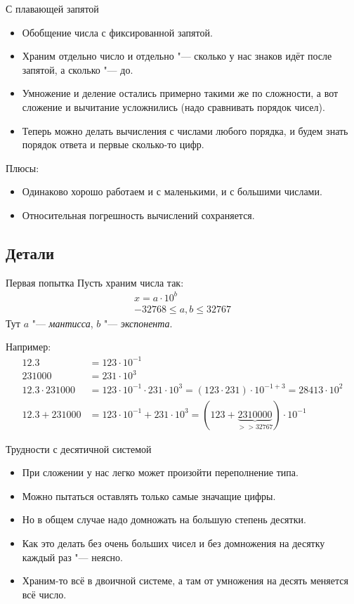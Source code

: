 \begin{frame}{С плавающей запятой}
	\begin{itemize}
		\item
			Обобщение числа с фиксированной запятой.
		\item
			Храним отдельно число и отдельно "--- сколько у нас знаков идёт после запятой, а сколько "--- до.
		\item
			Умножение и деление остались примерно такими же по сложности, а вот сложение и вычитание усложнились (надо сравнивать порядок чисел).
		\item
			Теперь можно делать вычисления с числами любого порядка, и будем знать порядок ответа и первые сколько-то цифр.
	\end{itemize}
	Плюсы:
	\begin{itemize}
		\item
			Одинаково хорошо работаем и с маленькими, и с большими числами.
		\item
			Относительная погрешность вычислений сохраняется.
	\end{itemize}
\end{frame}

\subsection{Детали}
\begin{frame}{Первая попытка}
	Пусть храним числа так:
	\begin{gather*}
		x = a \cdot 10^{b} \\
		-32768 \le a, b \le 32767
	\end{gather*}
	Тут $a$ "--- \textit{мантисса}, $b$ "--- \textit{экспонента}.

	Например:
	\begin{align*}
		12.3 &= 123 \cdot 10^{-1} \\
		231000 &= 231 \cdot 10^3 \\
		12.3 \cdot 231000 &= 123 \cdot 10^{-1} \cdot 231 \cdot 10^3 = (123 \cdot 231) \cdot 10^{-1+3} = 28413 \cdot 10^2 \\
		12.3 + 231000 &= 123 \cdot 10^{-1} + 231 \cdot 10^3 = (123 + \underbrace{2310000}_{>>32767}) \cdot 10^{-1}
	\end{align*}
\end{frame}

\begin{frame}{Трудности с десятичной системой}
	\begin{itemize}
		\item При сложении у нас легко может произойти переполнение типа.
		\item Можно пытаться оставлять только самые значащие цифры.
		\item Но в общем случае надо домножать на большую степень десятки.
		\item Как это делать без очень больших чисел и без домножения на десятку каждый раз "--- неясно.
		\item Храним-то всё в двоичной системе, а там от умножения на десять меняется всё число.
	\end{itemize}
\end{frame}

